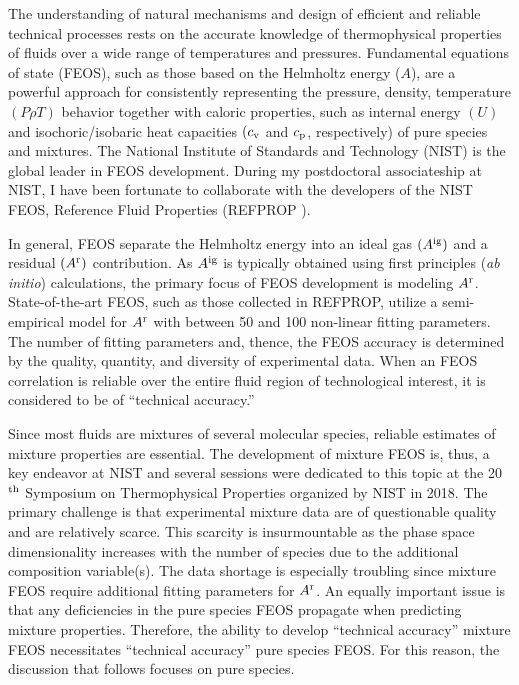 \documentclass[12pt,a4paper]{article}
\begin{document}
The understanding of natural mechanisms and design of efficient and reliable technical processes rests on the accurate knowledge of thermophysical properties of fluids over a wide range of temperatures and pressures. Fundamental equations of state (FEOS), such as those based on the Helmholtz energy ($A$), are a powerful approach for consistently representing the pressure, density, temperature $(P\rho T)$ behavior together with caloric properties, such as internal energy $(U)$ and isochoric/isobaric heat capacities $(c_{\rm v}$ and $c_{\rm p}$, respectively) of pure species and mixtures. The National Institute of Standards and Technology (NIST) is the global leader in FEOS development. During my postdoctoral associateship at NIST, I have been fortunate to collaborate with the developers of the NIST FEOS, Reference Fluid Properties (REFPROP \cite{LEMMON-RP91}). 


In general, FEOS separate the Helmholtz energy into an ideal gas $(A^{\rm ig})$ and a residual $(A^{\rm r})$ contribution. As $A^{\rm ig}$ is typically obtained using first principles (\textit{ab initio}) calculations, the primary focus of FEOS development is modeling $A^{\rm r}$. State-of-the-art FEOS, such as those collected in REFPROP, utilize a semi-empirical model for $A^{\rm r}$ with between 50 and 100 non-linear fitting parameters. The number of fitting parameters and, thence, the FEOS accuracy is determined by the quality, quantity, and diversity of experimental data. When an FEOS correlation is reliable over the entire fluid region of technological interest, it is considered to be of ``technical accuracy.'' 

Since most fluids are mixtures of several molecular species, reliable estimates of mixture properties are essential. The development of mixture FEOS is, thus, a key endeavor at NIST and several sessions were dedicated to this topic at the 20$^{\rm th}$ Symposium on Thermophysical Properties organized by NIST in 2018. The primary challenge is that experimental mixture data are of questionable quality and are relatively scarce. This scarcity is insurmountable as the phase space dimensionality increases with the number of species due to the additional composition variable(s). The data shortage is especially troubling since mixture FEOS require additional fitting parameters for $A^{\rm r}$. An equally important issue is that any deficiencies in the pure species FEOS propagate when predicting mixture properties. Therefore, the ability to develop ``technical accuracy'' mixture FEOS necessitates ``technical accuracy'' pure species FEOS. For this reason, the discussion that follows focuses on pure species. 
\end{document}
